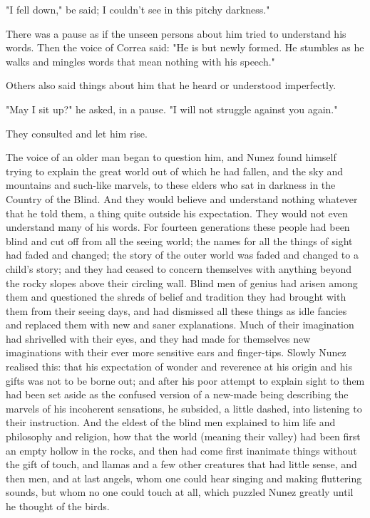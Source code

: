 \documentclass[submission]{sffms}
\begin{document}
"I fell down," be said; I couldn't see in this pitchy darkness."

There was a pause as if the unseen persons about him tried to
understand his words. Then the voice of Correa said: "He is but newly
formed. He stumbles as he walks and mingles words that mean nothing
with his speech."

Others also said things about him that he heard or understood
imperfectly.

"May I sit up?" he asked, in a pause. "I will not struggle against you
again."

They consulted and let him rise.

The voice of an older man began to question him, and Nunez found
himself trying to explain the great world out of which he had fallen,
and the sky and mountains and such-like marvels, to these elders who
sat in darkness in the Country of the Blind. And they would believe
and understand nothing whatever that he told them, a thing quite
outside his expectation. They would not even understand many of his
words. For fourteen generations these people had been blind and cut
off from all the seeing world; the names for all the things of sight
had faded and changed; the story of the outer world was faded and
changed to a child's story; and they had ceased to concern themselves
with anything beyond the rocky slopes above their circling wall. Blind
men of genius had arisen among them and questioned the shreds of
belief and tradition they had brought with them from their seeing
days, and had dismissed all these things as idle fancies and replaced
them with new and saner explanations. Much of their imagination had
shrivelled with their eyes, and they had made for themselves new
imaginations with their ever more sensitive ears and
finger-tips. Slowly Nunez realised this: that his expectation of
wonder and reverence at his origin and his gifts was not to be borne
out; and after his poor attempt to explain sight to them had been set
aside as the confused version of a new-made being describing the
marvels of his incoherent sensations, he subsided, a little dashed,
into listening to their instruction. And the eldest of the blind men
explained to him life and philosophy and religion, how that the world
(meaning their valley) had been first an empty hollow in the rocks,
and then had come first inanimate things without the gift of touch,
and llamas and a few other creatures that had little sense, and then
men, and at last angels, whom one could hear singing and making
fluttering sounds, but whom no one could touch at all, which puzzled
Nunez greatly until he thought of the birds.
\end{document}
